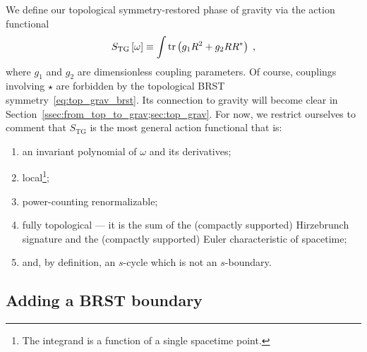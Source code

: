 \documentclass[../main.tex]{subfiles}
\begin{document}
We define our topological symmetry-restored phase of gravity via the action functional
\begin{equation}
  \label{eq:top_grav_action}
  S_{\text{TG}}\left[ \omega \right] \equiv \int \operatorname{tr} \left( g_1 R^2 + g_2 RR^* \right)\;,
\end{equation}
where $g_1$ and $g_2$ are dimensionless coupling parameters. Of course, couplings involving $ \star $ are forbidden by the topological BRST symmetry~\eqref{eq:top_grav_brst}. Its connection to gravity will become clear in Section~\ref{ssec:from_top_to_grav;sec:top_grav}. For now, we restrict ourselves to comment that $S_{\text{TG}}$ is the most general action functional that is:
\begin{enumerate}[label=\roman*)] %
  \item an invariant polynomial of $\omega$ and its derivatives;
  \item local\footnote{The integrand is a function of a single spacetime point. };
  \item power-counting renormalizable;
  \item fully topological --- it is the sum of the (compactly supported) Hirzebrunch signature and the (compactly supported) Euler characteristic of spacetime;
  \item  and, by definition, an $s$-cycle which is not an $s$-boundary.
\end{enumerate}

\subsection{Adding a BRST boundary}%
\label{ssec:brst_boundary;sec:top_grav}
\end{document}
